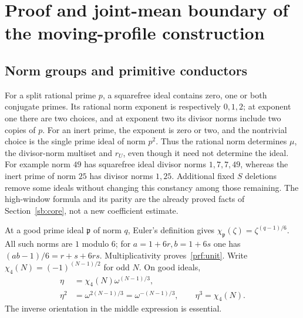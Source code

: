 \section{Proof and joint-mean boundary of the moving-profile construction}\label{prf:details}
\subsection{Norm groups and primitive conductors}
For a split rational prime $p$, a squarefree ideal contains zero, one or
both conjugate primes. Its rational norm exponent is respectively $0,1,2$;
at exponent one there are two choices, and at exponent two its divisor
norms include two copies of $p$. For an inert prime, the exponent is zero
or two, and the nontrivial choice is the single prime ideal of norm $p^2$.
Thus the rational norm determines $\mu$, the divisor-norm multiset and
$r_U$, even though it need not determine the ideal. For example norm $49$
has squarefree ideal divisor norms $1,7,7,49$, whereas the inert prime of
norm $25$ has divisor norms $1,25$. Additional fixed $S$ deletions remove
some ideals without changing this constancy among those remaining.
The high-window formula and its parity are the already proved facts of
Section~\ref{sb:core}, not a new coefficient estimate.

At a good prime ideal $\mathfrak p$ of norm $q$, Euler's definition gives
$\chi_{\mathfrak p}(\zeta)=\zeta^{(q-1)/6}$. All such norms are $1$ modulo
$6$; for $a=1+6r,b=1+6s$ one has
$(ab-1)/6=r+s+6rs$. Multiplicativity proves~\eqref{prf:unit}.
Write $\chi_4(N)=(-1)^{(N-1)/2}$ for odd $N$. On good ideals,
\begin{align*}
 \eta&=\chi_4(N)\omega^{(N-1)/3},\\
 \eta^2&=\omega^{2(N-1)/3}=\omega^{-(N-1)/3},\qquad
 \eta^3=\chi_4(N).
\end{align*}
The inverse orientation in the middle expression is essential.

